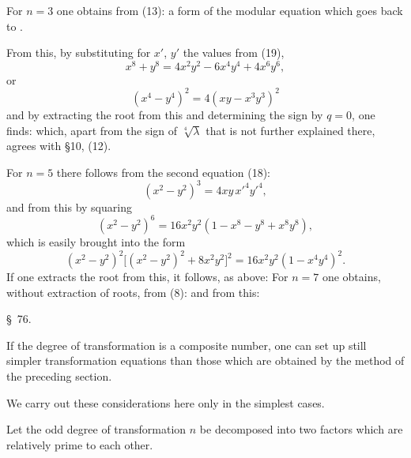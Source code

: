For $n=3$ one obtains from (13):
a form of the modular equation which goes back to .

From this, by substituting for $x'$, $y'$ the values from (19),
\[
x^8 + y^8 = 4x^2y^2 - 6x^4y^4 + 4x^6y^6,
\]
or
\[
(x^4 - y^4)^2 = 4(xy - x^3y^3)^2
\]
and by extracting the root from this and determining the sign
by $q=0$, one finds:
which, apart from the sign of $\sqrt[4]{\lambda}$ that is not further
explained there, agrees with \S 10, (12).

For $n=5$ there follows from the second equation (18):
\[
(x^2 - y^2)^3 = 4xy\,x'^4y'^4,
\]
and from this by squaring
\[
(x^2 - y^2)^6 = 16x^2y^2(1 - x^8 - y^8 + x^8y^8),
\]
which is easily brought into the form
\[
(x^2 - y^2)^2\bigl[(x^2 - y^2)^2 + 8x^2y^2\bigr]^2 = 16x^2y^2(1 - x^4y^4)^2.
\]
If one extracts the root from this, it follows, as above:
For $n=7$ one obtains, without extraction of roots, from (8):
and from this:

\begin{center}
\S\ 76.\quad {}
\end{center}

If the degree of transformation is a composite number, one can
set up still simpler transformation equations than those which are
obtained by the method of the preceding section.

We carry out these considerations here only in the simplest
cases.

Let the odd degree of transformation $n$ be decomposed into two
factors
which are relatively prime to each other.
